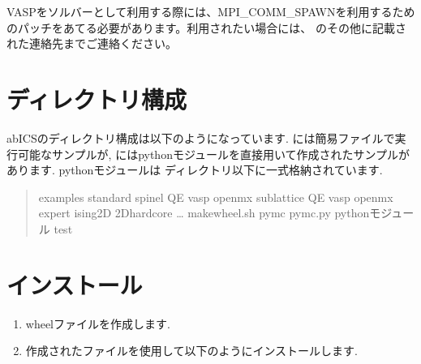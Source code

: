 \documentclass[letterpaper,10pt,dvipdfmx]{sphinxmanual}
\begin{document}
VASPをソルバーとして利用する際には、MPI\_COMM\_SPAWNを利用するためのパッチをあてる必要があります。利用されたい場合には、{\hyperref[\detokenize{contact/index::doc}]{}} のその他に記載された連絡先までご連絡ください。


\section{ディレクトリ構成}
\label{\detokenize{install/install:id3}}
abICSのディレクトリ構成は以下のようになっています.
 には簡易ファイルで実行可能なサンプルが,
 にはpythonモジュールを直接用いて作成されたサンプルがあります.
pythonモジュールは  ディレクトリ以下に一式格納されています.
\begin{quote}

\begin{sphinxVerbatim}[commandchars=\\\{\}]
 \PYGZhy{} examples
    \PYGZhy{} standard
        \PYGZhy{} spinel
            \PYGZhy{} QE
            \PYGZhy{} vasp
            \PYGZhy{} openmx
        \PYGZhy{} sub\PYGZhy{}lattice
            \PYGZhy{} QE
            \PYGZhy{} vasp
            \PYGZhy{} openmx
    \PYGZhy{} expert
        \PYGZhy{} ising2D
        \PYGZhy{} 2D\PYGZus{}hardcore
        …
\PYGZhy{} make\PYGZus{}wheel.sh
\PYGZhy{} py\PYGZus{}mc
    \PYGZhy{} pymc.py
    \PYGZhy{} pythonモジュール
\PYGZhy{} test
\end{sphinxVerbatim}
\end{quote}


\section{インストール}
\label{\detokenize{install/install:id4}}\begin{enumerate}
\item {} 
wheelファイルを作成します.

\end{enumerate}

\begin{enumerate}
\setcounter{enumi}{1}
\item {} 
作成されたファイルを使用して以下のようにインストールします.

\end{enumerate}

\end{document}
